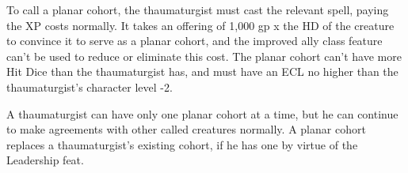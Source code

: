 \documentclass{article}
\begin{document}
To call a planar cohort, the thaumaturgist must cast the relevant spell, paying 
the XP costs normally. It takes an offering of 1,000 gp x the HD of the creature 
to convince it to serve as a planar cohort, and the improved ally class feature 
can't be used to reduce or eliminate this cost. The planar cohort can't have more 
Hit Dice than the thaumaturgist has, and must have an ECL no higher than the thaumaturgist's 
character level -2.

A thaumaturgist can have only one planar cohort at a time, but he can continue 
to make agreements with other called creatures normally. A planar cohort replaces 
a thaumaturgist's existing cohort, if he has one by virtue of the Leadership feat.

\newpage
\end{document}
